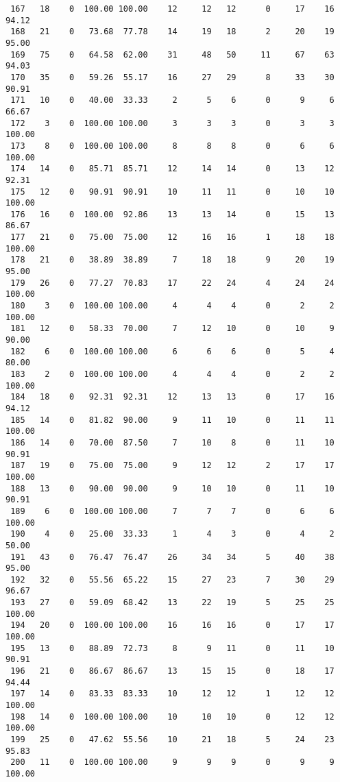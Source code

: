 \begin{verbatim}
 167   18    0  100.00 100.00    12     12   12      0     17    16    94.12
 168   21    0   73.68  77.78    14     19   18      2     20    19    95.00
 169   75    0   64.58  62.00    31     48   50     11     67    63    94.03
 170   35    0   59.26  55.17    16     27   29      8     33    30    90.91
 171   10    0   40.00  33.33     2      5    6      0      9     6    66.67
 172    3    0  100.00 100.00     3      3    3      0      3     3   100.00
 173    8    0  100.00 100.00     8      8    8      0      6     6   100.00
 174   14    0   85.71  85.71    12     14   14      0     13    12    92.31
 175   12    0   90.91  90.91    10     11   11      0     10    10   100.00
 176   16    0  100.00  92.86    13     13   14      0     15    13    86.67
 177   21    0   75.00  75.00    12     16   16      1     18    18   100.00
 178   21    0   38.89  38.89     7     18   18      9     20    19    95.00
 179   26    0   77.27  70.83    17     22   24      4     24    24   100.00
 180    3    0  100.00 100.00     4      4    4      0      2     2   100.00
 181   12    0   58.33  70.00     7     12   10      0     10     9    90.00
 182    6    0  100.00 100.00     6      6    6      0      5     4    80.00
 183    2    0  100.00 100.00     4      4    4      0      2     2   100.00
 184   18    0   92.31  92.31    12     13   13      0     17    16    94.12
 185   14    0   81.82  90.00     9     11   10      0     11    11   100.00
 186   14    0   70.00  87.50     7     10    8      0     11    10    90.91
 187   19    0   75.00  75.00     9     12   12      2     17    17   100.00
 188   13    0   90.00  90.00     9     10   10      0     11    10    90.91
 189    6    0  100.00 100.00     7      7    7      0      6     6   100.00
 190    4    0   25.00  33.33     1      4    3      0      4     2    50.00
 191   43    0   76.47  76.47    26     34   34      5     40    38    95.00
 192   32    0   55.56  65.22    15     27   23      7     30    29    96.67
 193   27    0   59.09  68.42    13     22   19      5     25    25   100.00
 194   20    0  100.00 100.00    16     16   16      0     17    17   100.00
 195   13    0   88.89  72.73     8      9   11      0     11    10    90.91
 196   21    0   86.67  86.67    13     15   15      0     18    17    94.44
 197   14    0   83.33  83.33    10     12   12      1     12    12   100.00
 198   14    0  100.00 100.00    10     10   10      0     12    12   100.00
 199   25    0   47.62  55.56    10     21   18      5     24    23    95.83
 200   11    0  100.00 100.00     9      9    9      0      9     9   100.00

\end{verbatim}
